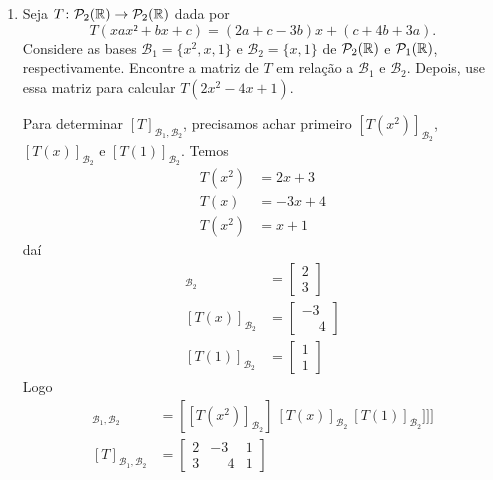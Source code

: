 \begin{exemplos}
\begin{enumerate}[label={\arabic*})]
        \item Seja $T \colon \mathcal{P}_2(\mathbb{R}) \to \mathcal{P}_2(\mathbb{R})$ dada por
        \[
            T(xax² + bx + c) = (2a + c - 3b)x + (c + 4b + 3a).
        \]
        Considere as bases $\mathcal{B}_1 = \{x^2, x, 1\}$ e $\mathcal{B}_2 = \{x, 1\}$ de $\mathcal{P}_2(\mathbb{R})$ e $\mathcal{P}_1(\mathbb{R})$, respectivamente. Encontre a matriz de $T$ em relação a $\mathcal{B}_1$ e $\mathcal{B}_2$. Depois, use essa matriz para calcular $T(2x^2 - 4x + 1)$.
        \begin{solucao}
            Para determinar $[T]_{\mathcal{B}_1, \mathcal{B}_2}$, precisamos achar primeiro $[T(x^2)]_{\mathcal{B}_2}$, $[T(x)]_{\mathcal{B}_2}$ e $[T(1)]_{\mathcal{B}_2}$.
            Temos
            \begin{align*}
              T(x^2) &= 2x + 3\\
                T(x) &= -3x + 4\\
                T(x^2) &= x + 1
            \end{align*}
            daí
            \begin{align*}
                [T(x^2)]_{\mathcal{B}_2} &= \begin{bmatrix}2\\3\end{bmatrix}\\
                [T(x)]_{\mathcal{B}_2} &= \begin{bmatrix}-3\\\phantom{-}4\end{bmatrix}\\
                [T(1)]_{\mathcal{B}_2} &= \begin{bmatrix}1\\1\end{bmatrix}
            \end{align*}
            Logo
            \begin{align*}
                [T]_{\mathcal{B}_1, \mathcal{B}_2} &= [[T(x^2)]_{\mathcal{B}_2}]\ [T(x)]_{\mathcal{B}_2}\ [T(1)]_{\mathcal{B}_2}]]]\\
                [T]_{\mathcal{B}_1, \mathcal{B}_2} &= \begin{bmatrix}2 & -3 & 1\\3 & \phantom{-}4 & 1\end{bmatrix}
            \end{align*}


\end{solucao}
\end{enumerate}
\end{exemplos}
